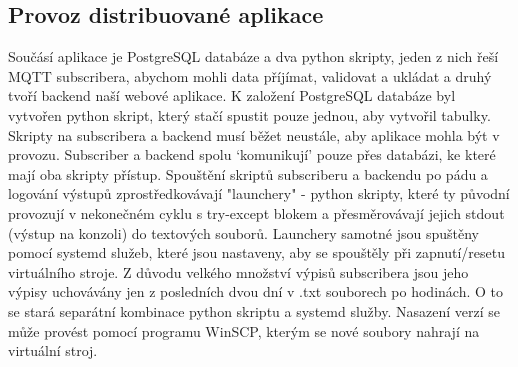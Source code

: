 \subsection{Provoz distribuované aplikace}
Součásí aplikace je PostgreSQL databáze a dva python skripty, jeden z nich řeší MQTT subscribera, abychom mohli data příjímat, validovat a ukládat a druhý tvoří backend naší webové aplikace.
K založení PostgreSQL databáze byl vytvořen python skript, který stačí spustit pouze jednou, aby vytvořil tabulky. Skripty na subscribera a backend musí běžet neustále, aby aplikace mohla být v provozu.
Subscriber a backend spolu `komunikují' pouze přes databázi, ke které mají oba skripty přístup.
Spouštění skriptů subscriberu a backendu po pádu a logování výstupů zprostředkovávají "launchery" - python skripty, které ty původní provozují v nekonečném cyklu s try-except blokem a přesměrovávají jejich stdout (výstup na konzoli) do textových souborů.
Launchery samotné jsou spuštěny pomocí systemd služeb, které jsou nastaveny, aby se spouštěly při zapnutí/resetu virtuálního stroje.
Z důvodu velkého množství výpisů subscribera jsou jeho výpisy uchovávány jen z posledních dvou dní v .txt souborech po hodinách. O to se stará separátní kombinace python skriptu a systemd služby.
Nasazení verzí se může provést pomocí programu WinSCP, kterým se nové soubory nahrají na virtuální stroj.